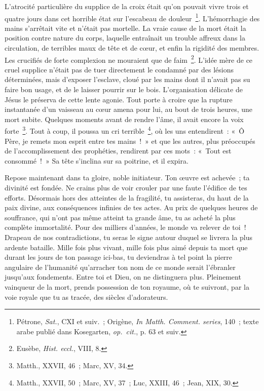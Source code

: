 \documentclass[french,twoside]{book} %
\newcommand\chapterclose{} %
\begin{document}
L’atrocité particulière du supplice de la croix était qu’on pouvait vivre trois et quatre jours dans cet horrible état sur l’escabeau de douleur \footnote{ Pétrone, {\itshape Sat.}, CXI et suiv. ; Origène, {\itshape In Matth. Comment. series}, 140 ; texte arabe publié dans Kosegarten, {\itshape op. cit.}, p. 63 et suiv.}. L’hémorrhagie des mains s’arrêtait vite et n’était pas mortelle. La vraie cause de la mort était la position contre nature du corps, laquelle entraînait un trouble affreux dans la circulation, de terribles maux de tête et de cœur, et enfin la rigidité des membres. Les crucifiés de forte complexion ne mouraient que de faim \footnote{ Eusèbe, {\itshape Hist. eccl.}, VIII, 8.}. L’idée mère de ce cruel supplice n’était pas de tuer directement le condamné par des lésions déterminées, mais d’exposer l’esclave, cloué par les mains dont il n’avait pas su faire bon usage, et de le laisser pourrir sur le bois. L’organisation délicate de Jésus le préserva de cette lente agonie. Tout porte à croire que la rupture instantanée d’un vaisseau au cœur amena pour lui, au bout de trois heures, une mort subite. Quelques moments avant de rendre l’âme, il avait encore la voix forte \footnote{Matth., XXVII, 46 ; Marc, XV, 34.}. Tout à coup, il poussa un cri terrible \footnote{Matth., XXVII, 50 ; Marc, XV, 37 ; Luc, XXIII, 46 ; Jean, XIX, 30.}, où les uns entendirent : « Ô Père, je remets mon esprit entre tes mains ! » et que les autres, plus préoccupés de l’accomplissement des prophéties, rendirent par ces mots : « Tout est consommé ! » Sa tête s’inclina sur sa poitrine, et il expira.\par
Repose maintenant dans ta gloire, noble initiateur. Ton œuvre est achevée ; ta divinité est fondée. Ne crains plus de voir crouler par une faute l’édifice de tes efforts. Désormais hors des atteintes de la fragilité, tu assisteras, du haut de la paix divine, aux conséquences infinies de tes actes. Au prix de quelques heures de souffrance, qui n’ont pas même atteint ta grande âme, tu as acheté la plus complète immortalité. Pour des milliers d’années, le monde va relever de toi ! Drapeau de nos contradictions, tu seras le signe autour duquel se livrera la plus ardente bataille. Mille fois plus vivant, mille fois plus aimé depuis ta mort que durant les jours de ton passage ici-bas, tu deviendras à tel point la pierre angulaire de l’humanité qu’arracher ton nom de ce monde serait l’ébranler jusqu’aux fondements. Entre toi et Dieu, on ne distinguera plus. Pleinement vainqueur de la mort, prends possession de ton royaume, où te suivront, par la voie royale que tu as tracée, des siècles d’adorateurs.
\chapterclose
\end{document}
